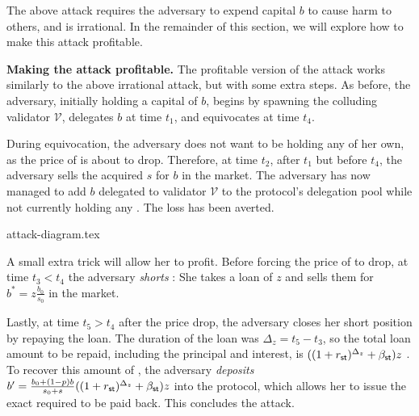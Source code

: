 The above attack requires the adversary to expend capital $b$ to cause
harm to others, and is irrational. In the remainder of this section, we
will explore how to make this attack profitable.


\noindent
\textbf{Making the attack profitable.}
The profitable version of the attack works similarly to the above
irrational attack, but with some extra steps. As before, the adversary, initially
holding a capital of $b$, begins by spawning the colluding validator $\mathcal{V}$,
delegates $b$ at time $t_1$, and equivocates at time $t_4$.

During equivocation, the adversary does not want to be holding any
\stasset of her own, as the price of \stasset is about to drop.
Therefore, at time $t_2$, after $t_1$ but before $t_4$, the adversary sells
the acquired $s$ \stasset for $b$ \asset in the market.
The adversary has now managed to add $b$ \asset delegated to validator $\mathcal{V}$
to the protocol's delegation pool while not currently holding
any \stasset. The loss has been averted.

{attack-diagram.tex}

A small extra trick will allow her to profit.
Before forcing the price of \stasset to drop, at time $t_3 < t_4$
the adversary \emph{shorts}
\stasset: She takes a loan of $z$ \stassets and
sells
them for $b^* = z \frac{b_0}{s_0}$ \asset in the market.

Lastly, at time $t_5 > t_4$ after the price drop, the adversary closes her short position by repaying the
\stasset loan. The duration of the loan was $\Delta_z = t_5 - t_3$, so the
total loan amount to be repaid, including the principal and interest, is
$((1 + r_{\textsf{st}})^{\Delta_z} + \beta_{\textsf{st}}) z$ \stasset.
To recover this amount of \stasset, the adversary \emph{deposits}
$b' = \frac{b_0 + (1 - p) b}{s_0 + s} ((1 + r_{\textsf{st}})^{\Delta_z} + \beta_{\textsf{st}}) z$ \asset
into the protocol, which allows her to issue the exact required \stasset
to be paid back. This concludes the attack.

